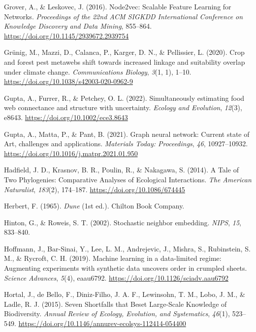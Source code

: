 \documentclass[10pt,oneside]{article}
\newlength{\cslhangindent}
\newenvironment{CSLReferences}[2] %
 {%
  \setlength{\parindent}{0pt}
  \ifodd #1 \everypar{\setlength{\hangindent}{\cslhangindent}}\ignorespaces\fi
  \ifnum #2 > 0
  \setlength{\parskip}{#2\baselineskip}
  \fi
 }%
 {}
\begin{document}
\begin{CSLReferences}{1}{0}
\leavevmode{}%
Grover, A., \& Leskovec, J. (2016). Node2vec: Scalable Feature Learning
for Networks. \emph{Proceedings of the 22nd ACM SIGKDD International
Conference on Knowledge Discovery and Data Mining}, 855--864.
\url{https://doi.org/10.1145/2939672.2939754}

\leavevmode{}%
Grünig, M., Mazzi, D., Calanca, P., Karger, D. N., \& Pellissier, L.
(2020). Crop and forest pest metawebs shift towards increased linkage
and suitability overlap under climate change. \emph{Communications
Biology}, \emph{3}(1, 1), 1--10.
\url{https://doi.org/10.1038/s42003-020-0962-9}

\leavevmode{}%
Gupta, A., Furrer, R., \& Petchey, O. L. (2022). Simultaneously
estimating food web connectance and structure with uncertainty.
\emph{Ecology and Evolution}, \emph{12}(3), e8643.
\url{https://doi.org/10.1002/ece3.8643}

\leavevmode{}%
Gupta, A., Matta, P., \& Pant, B. (2021). Graph neural network: Current
state of Art, challenges and applications. \emph{Materials Today:
Proceedings}, \emph{46}, 10927--10932.
\url{https://doi.org/10.1016/j.matpr.2021.01.950}

\leavevmode{}%
Hadfield, J. D., Krasnov, B. R., Poulin, R., \& Nakagawa, S. (2014). A
Tale of Two Phylogenies: Comparative Analyses of Ecological
Interactions. \emph{The American Naturalist}, \emph{183}(2), 174--187.
\url{https://doi.org/10.1086/674445}

\leavevmode{}%
Herbert, F. (1965). \emph{Dune} (1st ed.). Chilton Book Company.

\leavevmode{}%
Hinton, G., \& Roweis, S. T. (2002). Stochastic neighbor embedding.
\emph{NIPS}, \emph{15}, 833--840.

\leavevmode{}%
Hoffmann, J., Bar-Sinai, Y., Lee, L. M., Andrejevic, J., Mishra, S.,
Rubinstein, S. M., \& Rycroft, C. H. (2019). Machine learning in a
data-limited regime: Augmenting experiments with synthetic data uncovers
order in crumpled sheets. \emph{Science Advances}, \emph{5}(4),
eaau6792. \url{https://doi.org/10.1126/sciadv.aau6792}

\leavevmode{}%
Hortal, J., de Bello, F., Diniz-Filho, J. A. F., Lewinsohn, T. M., Lobo,
J. M., \& Ladle, R. J. (2015). Seven Shortfalls that Beset Large-Scale
Knowledge of Biodiversity. \emph{Annual Review of Ecology, Evolution,
and Systematics}, \emph{46}(1), 523--549.
\url{https://doi.org/10.1146/annurev-ecolsys-112414-054400}


\end{CSLReferences}
\end{document}
